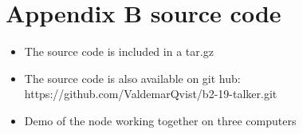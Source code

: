 \chapter{Appendix B source code}\label{ch:appBlabel}


\begin{itemize}
    
    
    \item The source code is included in a tar.gz
    \item The source code is also available on git hub:\\https://github.com/ValdemarQvist/b2-19-talker.git\\
    \item Demo of the node working together on three computers



\end{itemize}



